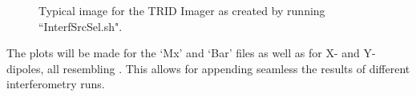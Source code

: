 \begin{figure}[th]
	\caption{Typical image for the TRID Imager as created by running ``InterfSrcSel.sh".}	 
\end{figure}

The plots will be made for the `Mx' and `Bar' files as well as for X- and Y-dipoles, all resembling . This allows for appending seamless the results of different interferometry runs.

